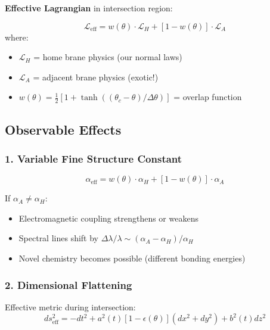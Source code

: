 \textbf{Effective Lagrangian} in intersection region:

\begin{equation}
\label{eq:eff-lagrangian}
\mathcal{L}_{\text{eff}} = w(\theta)\cdot\mathcal{L}_H + [1-w(\theta)]\cdot\mathcal{L}_A
\end{equation}
where:
\begin{itemize}
\item $\mathcal{L}_H$ = home brane physics (our normal laws)
\item $\mathcal{L}_A$ = adjacent brane physics (exotic!)
\item $w(\theta) = \frac{1}{2}[1 + \tanh((\theta_c - \theta)/\Delta\theta)]$ = overlap function
\end{itemize}

\subsection{Observable Effects}

\subsubsection{1. Variable Fine Structure Constant}

\begin{equation}
\label{eq:alpha-blend}
\alpha_{\text{eff}} = w(\theta)\cdot\alpha_H + [1-w(\theta)]\cdot\alpha_A
\end{equation}

If $\alpha_A \neq \alpha_H$:
\begin{itemize}
\item Electromagnetic coupling strengthens or weakens
\item Spectral lines shift by $\Delta\lambda/\lambda \sim (\alpha_A - \alpha_H)/\alpha_H$
\item Novel chemistry becomes possible (different bonding energies)
\end{itemize}

\subsubsection{2. Dimensional Flattening}

Effective metric during intersection:
\begin{equation}
\label{eq:metric-flatten}
ds^2_{\text{eff}} = -dt^2 + a^2(t)[1-\epsilon(\theta)](dx^2+dy^2) + b^2(t)dz^2
\end{equation}

